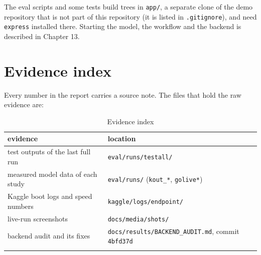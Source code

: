 The eval scripts and some tests build trees in \texttt{app/\allowbreak{}}, a separate clone of the demo repository that is not part of this repository (it is listed in \texttt{.\allowbreak{}gitignore}), and need \texttt{express} installed there. Starting the model, the workflow and the backend is described in Chapter 13.

\section{Evidence index}

Every number in the report carries a source note. The files that hold the raw evidence are:

\begingroup\small
\begin{longtable}{>{\raggedright\arraybackslash}p{0.362\dimexpr\linewidth-4\tabcolsep\relax}>{\raggedright\arraybackslash}p{0.638\dimexpr\linewidth-4\tabcolsep\relax}}
\toprule
\rowcolor{gray!14}\textbf{evidence} & \textbf{location} \\
\midrule
\endhead
\bottomrule
\endfoot
\endlastfoot
test outputs of the last full run & \texttt{eval/\allowbreak{}runs/\allowbreak{}testall/\allowbreak{}} \\
measured model data of each study & \texttt{eval/\allowbreak{}runs/\allowbreak{}} (\texttt{kout\_\allowbreak{}*}, \texttt{golive*}) \\
Kaggle boot logs and speed numbers & \texttt{kaggle/\allowbreak{}logs/\allowbreak{}endpoint/\allowbreak{}} \\
live-run screenshots & \texttt{docs/\allowbreak{}media/\allowbreak{}shots/\allowbreak{}} \\
backend audit and its fixes & \texttt{docs/\allowbreak{}results/\allowbreak{}BACKEND\_\allowbreak{}AUDIT.\allowbreak{}md}, commit \texttt{4bfd37d} \\
\bottomrule
\caption{Evidence index}\label{tab:appendix-3}\\
\end{longtable}
\endgroup

